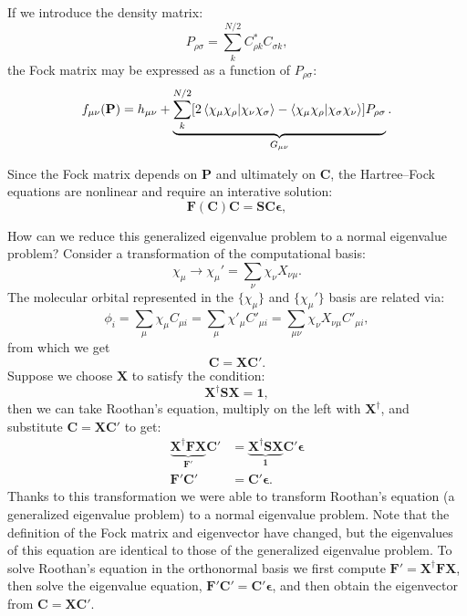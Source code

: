 \documentclass[../Main/chem532-notes.tex]{subfiles}
\begin{document}
If we introduce the density matrix:
\begin{equation}
P_{\rho\sigma} = \sum_k^{N/2} C_{\rho k}^* C_{\sigma k},
\end{equation}
the Fock matrix may be expressed as a function of $P_{\rho\sigma}$:
\begin{equation}
f_{\mu\nu}(\mathbf{P}) = h_{\mu\nu}
+\underbrace{
\sum_k^{N/2} [ 2 \braket{\chi_\mu \chi_\rho|\chi_\nu \chi_\sigma} 
- \braket{\chi_\mu \chi_\rho|\chi_\sigma \chi_\nu }] P_{\rho\sigma}
}_{G_{\mu\nu}}.
\end{equation}

Since the Fock matrix depends on $\mathbf{P}$ and ultimately on $\mathbf{C}$, the Hartree--Fock equations are nonlinear and require an interative solution:
\begin{equation}
 \mathbf{F}(\mathbf{C})\mathbf{C} = \mathbf{S}\mathbf{C}\boldsymbol{\epsilon},
\end{equation}

How can we reduce this generalized eigenvalue problem to a normal eigenvalue problem?
Consider a transformation of the computational basis:
\begin{equation}
\chi_\mu \rightarrow \chi_\mu' = \sum_\nu \chi_\nu X_{\nu\mu}.
\end{equation}
The molecular orbital represented in the $\{\chi_\mu\}$ and $\{\chi_\mu'\}$ basis are related via:
\begin{equation}
\phi_i = \sum_\mu \chi_\mu C_{\mu i} = \sum_\mu \chi'_\mu C'_{\mu i} = \sum_{\mu \nu} \chi_\nu X_{\nu\mu}  C'_{\mu i},
\end{equation}
from which we get
\begin{equation}
\mathbf{C} = \mathbf{XC}'.
\end{equation}
Suppose we choose $\mathbf{X}$ to satisfy the condition:
\begin{equation}
\mathbf{X}^\dagger \mathbf{SX} = \mathbf{1},
\end{equation}
then we can take Roothan's equation, multiply on the left with $\mathbf{X}^\dagger$, and substitute $\mathbf{C} = \mathbf{XC}'$ to get:
\begin{equation}
\begin{split}
\underbrace{\mathbf{X}^\dagger\mathbf{F}\mathbf{X}}_{\mathbf{F}'}\mathbf{C}' &= \underbrace{\mathbf{X}^\dagger\mathbf{S}\mathbf{X}}_{\mathbf{1}}\mathbf{C}'\boldsymbol{\epsilon} \\
\mathbf{F}'\mathbf{C}' &= \mathbf{C}'\boldsymbol{\epsilon}.
\end{split}
\end{equation}
Thanks to this transformation we were able to transform Roothan's equation (a generalized eigenvalue problem) to a normal eigenvalue problem.
Note that the definition of the Fock matrix and eigenvector have changed, but the eigenvalues of this equation are identical to those of the generalized eigenvalue problem.
To solve Roothan's equation in the orthonormal basis we first compute $\mathbf{F}' =\mathbf{X}^\dagger\mathbf{F}\mathbf{X}$, then solve the  eigenvalue equation, $\mathbf{F}'\mathbf{C}' = \mathbf{C}'\boldsymbol{\epsilon}$, and then obtain the eigenvector from $\mathbf{C} = \mathbf{XC}'$.
\end{document}
